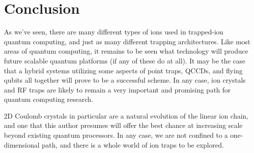 \section{Conclusion}
As we've seen, there are many different types of ions used in trapped-ion quantum computing, and just as many different trapping architectures. Like most areas of quantum computing, it remains to be seen what technology will produce future scalable quantum platforms (if any of these do at all). It may be the case that a hybrid systems utilizing some aspects of point traps, QCCDs, and flying qubits all together will prove to be a successful scheme. In any case, ion crystals and RF traps are likely to remain a very important and promising path for quantum computing research.

2D Coulomb crystals in particular are a natural evolution of the linear ion chain, and one that this author presumes will offer the best chance at increasing scale beyond existing quantum processors. In any case, we are not confined to a one-dimensional path, and there is a whole world of ion traps to be explored.